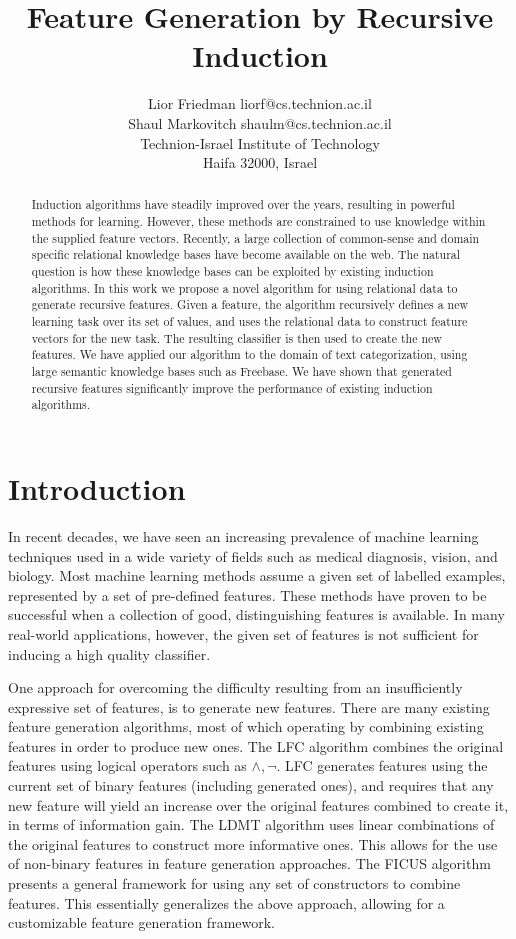 \documentclass[twoside,11pt]{article}
\title{Feature Generation by Recursive Induction}
\author{\name Lior Friedman \email liorf@cs.technion.ac.il \\
	\name Shaul Markovitch \email shaulm@cs.technion.ac.il \\
	\addr Technion-Israel Institute of Technology\\
	Haifa 32000, Israel
	}
\theoremstyle{definition}
\begin{document}
\maketitle

\begin{abstract}
  Induction algorithms have steadily improved over the years, resulting in powerful methods for learning. However, these methods are constrained to use knowledge within the supplied feature vectors. Recently, a large collection of common-sense and domain specific relational knowledge bases have become available on the web. The natural question is how these knowledge bases can be exploited by existing induction algorithms.
  In this work we propose a novel algorithm for using relational data to generate recursive features. Given a feature, the algorithm recursively defines a new learning task over its set of values, and uses the relational data to construct feature vectors for the new task. The resulting classifier is then used to create the new features.
  We have applied our algorithm to the domain of text categorization, using large semantic knowledge bases such as Freebase. We have shown that generated recursive features significantly improve the performance of existing induction algorithms.
\end{abstract}

\section{Introduction}
\label{sec:Intro}
In recent decades, we have seen an increasing prevalence of machine learning techniques used in a wide variety of fields such as medical diagnosis, vision, and biology.
Most machine learning methods assume a given set of labelled examples, represented by a set of
pre-defined features. These methods have proven to be successful when a collection of good,
distinguishing features is available.
In many real-world applications, however, the given set of features is not sufficient for inducing a high quality classifier.

One approach for overcoming the difficulty resulting from an insufficiently expressive set of features, is to generate new features. There are many existing feature generation algorithms, most of which operating by combining existing features in order to produce new ones. The LFC algorithm \cite{ragavan1993complex} combines the original features using logical operators such as $\land ,\lnot$. LFC generates features using the current set of binary features (including generated ones), and requires that any new feature will yield an increase over the original features combined to create it, in terms of information gain.
The LDMT algorithm \cite{utgo1991linear} uses linear combinations of the original features to construct more informative ones. This allows for the use of non-binary features in feature generation approaches.
The FICUS algorithm \cite{markovitch2002feature} presents a general framework for using any set of constructors to combine features. This essentially generalizes the above approach, allowing for a customizable feature generation framework.
\end{document}
